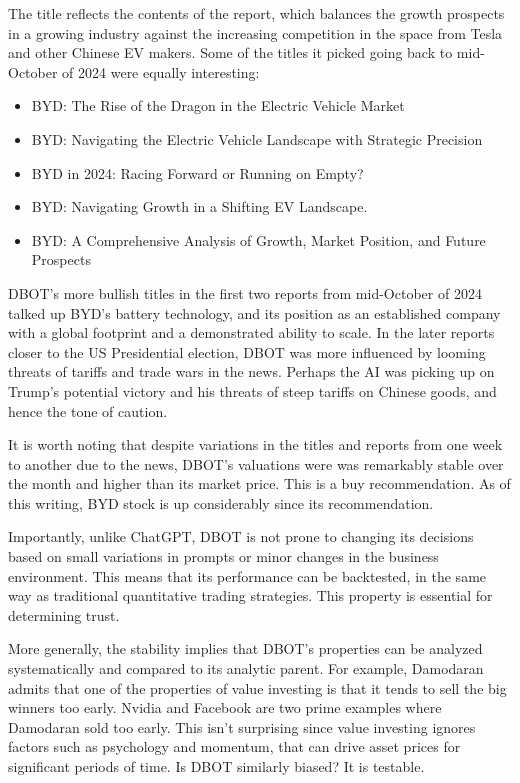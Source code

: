 \documentclass[]{interact}
\theoremstyle{plain}%
\theoremstyle{definition}
\theoremstyle{remark}
\begin{document}
The title reflects the contents of the report, which balances the growth prospects in a growing industry against the increasing competition in the space from Tesla and other Chinese EV makers. Some of the titles it picked going back to mid-October of 2024 were equally interesting:
\begin{itemize}
    \item 	BYD: The Rise of the Dragon in the Electric Vehicle Market
    \item 	BYD: Navigating the Electric Vehicle Landscape with Strategic Precision
    \item 	BYD in 2024: Racing Forward or Running on Empty?
    \item 	BYD: Navigating Growth in a Shifting EV Landscape.
    \item 	BYD: A Comprehensive Analysis of Growth, Market Position, and Future Prospects
\end{itemize}

DBOT's more bullish titles in the first two reports from mid-October of 2024 talked up BYD’s battery technology, and its position as an established company with a global footprint and a demonstrated ability to scale. In the later reports closer to the US Presidential election, DBOT was more influenced by looming threats of tariffs and trade wars in the news. Perhaps the AI was picking up on Trump’s potential victory and his threats of steep tariffs on Chinese goods, and hence the tone of caution.

It is worth noting that despite variations in the titles and reports from one week to another due to the news, DBOT's valuations were was remarkably stable over the month and higher than its market price. This is a buy recommendation. As of this writing, BYD stock is up considerably since its recommendation.

Importantly, unlike ChatGPT, DBOT is not prone to changing its decisions based on small variations in prompts or minor changes in the business environment. This means that its performance can be backtested, in the same way as traditional quantitative trading strategies. This property is essential for determining trust. 

More generally, the stability implies that DBOT’s properties can be analyzed systematically and compared to its analytic parent. For example, Damodaran admits that one of the properties of value investing is that it tends to sell the big winners too early. Nvidia and Facebook are two prime examples where Damodaran sold too early. This isn’t surprising since value investing ignores factors such as psychology and momentum, that can drive asset prices for significant periods of time. Is DBOT similarly biased? It is testable.
\end{document}
